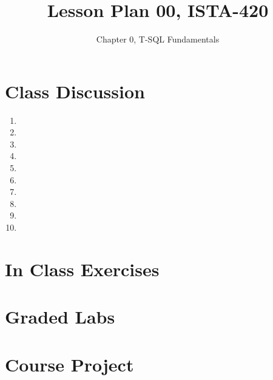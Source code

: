 \documentclass{article}
\title{Lesson Plan 00, ISTA-420}
\author{Chapter 0, T-SQL Fundamentals}
\date{}
\begin{document}
    

    \maketitle{}

    \section{Class Discussion}

    \begin{enumerate}
        \item 
        \item 
        \item 
        \item 
        \item 
        \item 
        \item 
        \item 
        \item 
        \item 
    \end{enumerate}

    \section{In Class Exercises}


        \subsection{}

        
        \subsection{}

    \section{Graded Labs}


        \subsection{}

        
        \subsection{}


    \section{Course Project}
\end{document}
